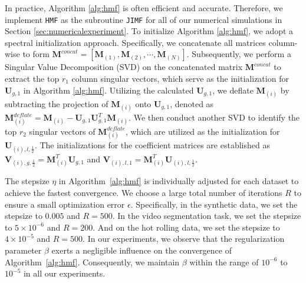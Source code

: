\documentclass[twoside,11pt]{article}
\def\inneralg{\texttt{JIMF}\xspace}
\def\hmf{\texttt{HMF}\xspace}
\newcommand{\matM}{\mathbf{M}}
\newcommand{\matU}{\mathbf{U}}
\newcommand{\matV}{\mathbf{V}}
\newcommand{\fracud}{\frac{1}{2}}
\begin{document}
In practice, Algorithm \ref{alg:hmf} is often efficient and accurate. Therefore, we implement \hmf as the subroutine \inneralg for all of our numerical simulations in Section \ref{sec:numericalexperiment}. To initialize Algorithm \ref{alg:hmf}, we adopt a spectral initialization approach. Specifically, we concatenate all matrices column-wise to form $\matM^{concat}=[\matM_{(1)},\matM_{(2)},\cdots,\matM_{(N)}]$. Subsequently, we perform a Singular Value Decomposition (SVD) on the concatenated matrix $\matM^{concat}$ to extract the top $r_1$ column singular vectors, which serve as the initialization for $\matU_{g,1}$ in Algorithm \ref{alg:hmf}. Utilizing the calculated $\matU_{g,1}$, we deflate $\matM_{(i)}$ by subtracting the projection of $\matM_{(i)}$ onto $\matU_{g,1}$, denoted as $\matM_{(i)}^{deflate} = \matM_{(i)} -\matU_{g,1}\matU_{g,1}^T\matM_{(i)}$. We then conduct another SVD to identify the top $r_2$ singular vectors of $\matM_{(i)}^{deflate}$, which are utilized as the initialization for $\matU_{(i),l,\fracud}$. The initializations for the coefficient matrices are established as $\matV_{(i),g,\fracud} = \matM_{(i)}^T\matU_{g,1}$ and $\matV_{(i),l,1} = \matM_{(i)}^T\matU_{(i),l,\fracud}$.

The stepsize $\eta$ in Algorithm~\ref{alg:hmf} is individually adjusted for each dataset to achieve the fastest convergence. We choose a large total number of iterations $R$ to ensure a small optimization error $\epsilon$. 
Specifically, in the synthetic data, we set the stepsize to $0.005$ and $R=500$. In the video segmentation task, we set the stepsize to $5\times10^{-6}$ and $R=200$. And on the hot rolling data, we set the stepsize to $4\times 10^{-5}$ and $R=500$. In our experiments, we observe that the regularization parameter $\beta$ exerts a negligible influence on the convergence of Algorithm~\ref{alg:hmf}. Consequently, we maintain $\beta$ within the range of $10^{-6}$ to $10^{-5}$ in all our experiments.
\end{document}
